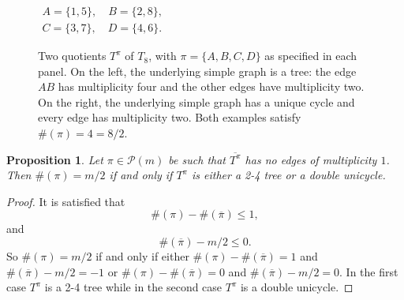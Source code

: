 \documentclass{article}
\newtheorem{proposition}[theorem]{Proposition}
\theoremstyle{definition}
\newcommand{\cP}{\mathcal{P}}
\begin{document}
{\begin{figure}[htbp]
\begin{minipage}{0.48\linewidth}

\smallskip
{\small
$\begin{gathered}
 A=\{1,5\},\quad B=\{2,8\},\\
 C=\{3,7\},\quad D=\{4,6\}.
\end{gathered}$
}
\end{minipage}

\caption{Two quotients $T^\pi$ of $T_8$, with
$\pi=\{A,B,C,D\}$ as specified in each panel.
On the left, the underlying simple graph is a tree:
the edge $AB$ has multiplicity four and the other edges
have multiplicity two.
On the right, the underlying simple graph has a unique cycle
and every edge has multiplicity two.
Both examples satisfy $\#(\pi)=4=8/2$.}
\label{fig:two-four-tree-unicycle}
\end{figure}

\begin{proposition}\label{Proposition: Characterization of pi=m/2}
Let $\pi\in \cP(m)$ be such that $\overline{T^\pi}$ has no edges of multiplicity $1$. Then $\#(\pi)=m/2$ if and only if $T^\pi$ is either a 2-4 tree or a double unicycle.
\end{proposition}
\begin{proof}
It is satisfied that 
$$\#(\pi)-\#(\overline{\pi})\leq 1,$$
and
$$\#(\overline{\pi})-m/2\leq 0.$$
So $\#(\pi)=m/2$ if and only if either $\#(\pi)-\#(\overline{\pi})=1$ and $\#(\overline{\pi})-m/2=-1$ or
$\#(\pi)-\#(\overline{\pi})=0$ and $\#(\overline{\pi})-m/2=0$. In the first case $T^\pi$ is a 2-4 tree while in the second case $T^\pi$ is a double unicycle. 
\end{proof}

}
\end{document}
